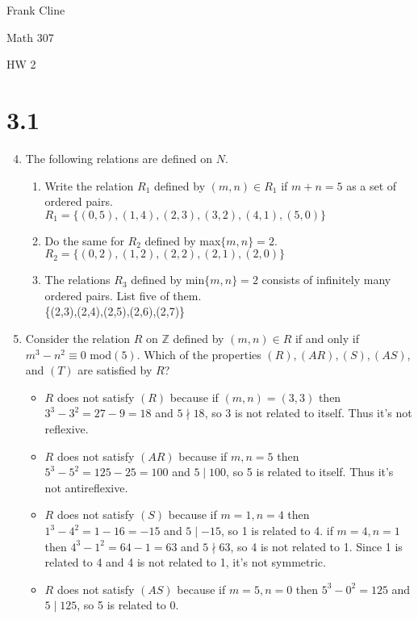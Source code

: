 \documentclass[11pt]{article}
\newcommand{\Z}{\mathbb{Z}}
\begin{document}
\onehalfspacing
\hfill Frank Cline

\hfill Math 307

\hfill HW 2


\section*{3.1}

\begin{enumerate}
\setcounter{enumi}{3}
\item The following relations are defined on $N$.
	\begin{enumerate}
	\item Write the relation $R_1$ defined by $(m,n)\in R_1$ if $m+n=5$ as a set of ordered pairs.\\
	$R_1=\{(0,5),(1,4),(2,3),(3,2),(4,1),(5,0)\}$
	\item Do the same for $R_2$ defined by max$\{m,n\}=2$.\\
	$R_2=\{(0,2),(1,2),(2,2),(2,1),(2,0)\}$
	\item The relations $R_3$ defined by min$\{m,n\}=2$ consists of infinitely many ordered pairs. List five 	of them.\\
	\{(2,3),(2,4),(2,5),(2,6),(2,7)\}
	\end{enumerate}
\setcounter{enumi}{5}
\item Consider the relation $R$ on $\Z$ defined by $(m,n)\in R$ if and only if $m^3-n^2\equiv 0$ mod$(5)$. Which of the properties $(R),(AR),(S),(AS)$, and $(T)$ are satisfied by $R$?
	\begin{itemize}
	\item $R$ does not satisfy $(R)$ because if $(m,n)=(3,3)$ then $3^3-3^2=27-9=18$ and $5\nmid18$, so 3 is not related to 			itself. Thus it's not reflexive.
	\item $R$ does not satisfy $(AR)$ because if $m,n=5$ then $5^3-5^2=125-25=100$ and $5\mid100$, so 5 is related to 
	itself. Thus it's not antireflexive.
	\item $R$ does not satisfy $(S)$ because if $m=1,n=4$ then $1^3-4^2=1-16=-15$ and $5\mid-15$, so 1 is related to 4.
	if $m=4,n=1$ then $4^3-1^2=64-1=63$ and $5\nmid63$, so 4 is not related to 1. Since 1 is related to 4 
	and 4 is not related to 1, it's not symmetric.
	\item $R$ does not satisfy $(AS)$ because if $m=5,n=0$ then $5^3-0^2=125$ and $5\mid125$, so 5 is related to 0.

\end{itemize}
\end{enumerate}
\end{document}
